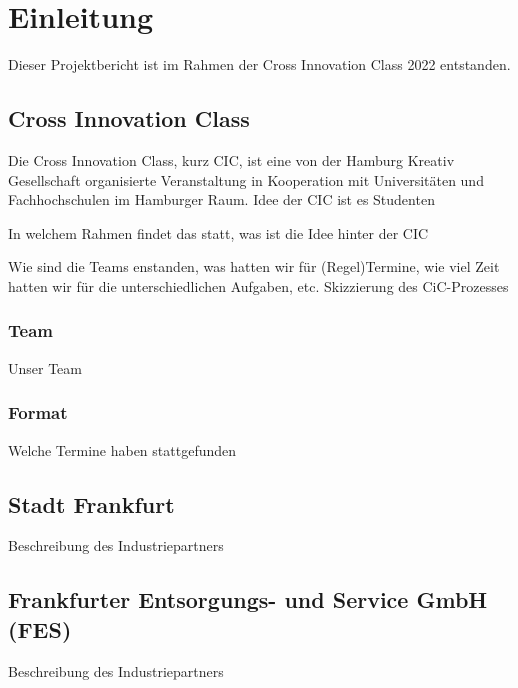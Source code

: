 \chapter{Einleitung}

    Dieser Projektbericht ist im Rahmen der Cross Innovation Class 2022 entstanden.

\section{Cross Innovation Class}

    Die Cross Innovation Class, kurz CIC, ist eine von der Hamburg Kreativ Gesellschaft organisierte Veranstaltung in Kooperation mit Universitäten und Fachhochschulen im Hamburger Raum.
    Idee der CIC ist es Studenten

    In welchem Rahmen findet das statt,
    was ist die Idee hinter der CIC

    Wie sind die Teams enstanden, was hatten wir für (Regel)Termine, wie viel Zeit hatten wir für die unterschiedlichen Aufgaben, etc.
    Skizzierung des CiC-Prozesses

    \subsection{Team}

        Unser Team


    \subsection{Format}

        Welche Termine haben stattgefunden


\section{Stadt Frankfurt}

    Beschreibung des Industriepartners


\section{Frankfurter Entsorgungs- und Service GmbH (FES)}

    Beschreibung des Industriepartners

